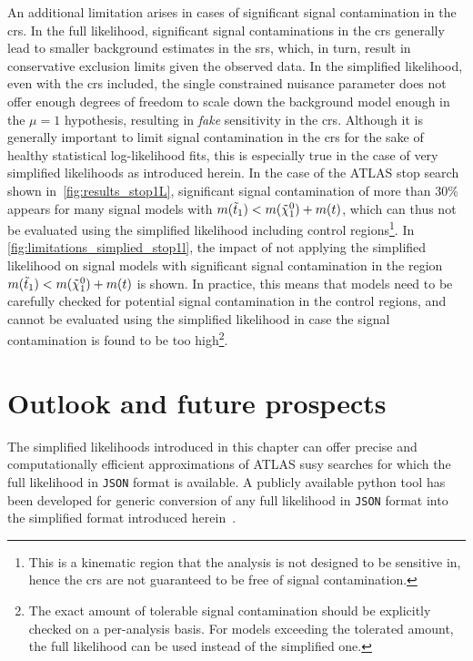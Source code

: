 An additional limitation arises in cases of significant signal contamination in the \glspl{cr}. In the full likelihood, significant signal contaminations in the \glspl{cr} generally lead to smaller background estimates in the \glspl{sr}, which, in turn, result in conservative exclusion limits given the observed data.
In the simplified likelihood, even with the \glspl{cr} included, the single constrained nuisance parameter does not offer enough degrees of freedom to scale down the background model enough in the $\mu = 1$ hypothesis, resulting in \textit{fake} sensitivity in the \glspl{cr}.
Although it is generally important to limit signal contamination in the \glspl{cr} for the sake of healthy statistical log-likelihood fits, this is especially true in the case of very simplified likelihoods as introduced herein.
In the case of the ATLAS stop search shown in~\cref{fig:results_stop1L}, significant signal contamination of more than 30\% appears for many signal models with $m(\tilde{t}_1) < m(\tilde{\chi}_1^0)+m(t)$, which can thus not be evaluated using the simplified likelihood including control regions\footnote{This is a kinematic region that the analysis is not designed to be sensitive in, hence the \glspl{cr} are not guaranteed to be free of signal contamination.}. In \cref{fig:limitations_simplied_stop1l}, the impact of not applying the simplified likelihood on signal models with significant signal contamination in the region $m(\tilde{t}_1) < m(\tilde{\chi}_1^0)+m(t)$ is shown. In practice, this means that models need to be carefully checked for potential signal contamination in the control regions, and cannot be evaluated using the simplified likelihood in case the signal contamination is found to be too high\footnote{The exact amount of tolerable signal contamination should be explicitly checked on a per-analysis basis. For models exceeding the tolerated amount, the full likelihood can be used instead of the simplified one.}.

\section{Outlook and future prospects}\label{sec:simplify_outlook}

The simplified likelihoods introduced in this chapter can offer precise and computationally efficient approximations of ATLAS \gls{susy} searches for which the full likelihood in \texttt{JSON} format is available. A publicly available python tool has been developed for generic conversion of any full likelihood in \texttt{JSON} format into the simplified format introduced herein~\cite{simplify}.

